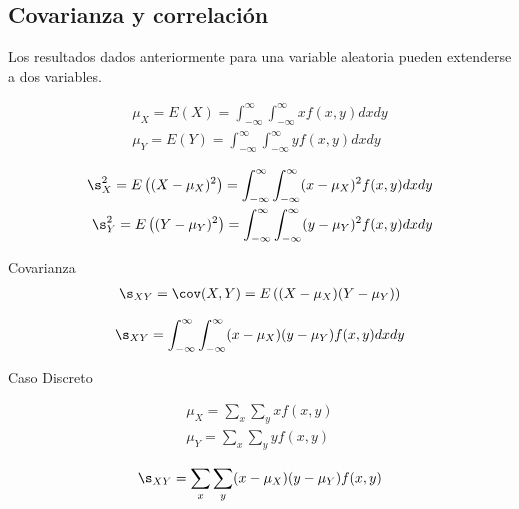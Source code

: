 \subsection{Covarianza y correlación}

Los resultados dados anteriormente para una variable aleatoria pueden extenderse a dos variables.


{}

\begin{equation}
 \label{eq:0.3.43}
 \begin{split}
  \mu_{X}=E(X)=\int_{-\infty}^{\infty}\int_{-\infty}^{\infty} xf(x,y)dxdy\\ 
  \mu_{Y}=E(Y)=\int_{-\infty}^{\infty}\int_{-\infty}^{\infty}
  yf(x,y)dxdy
 \end{split}
\end{equation}





\begin{equation}
 \label{eq:0.3.44}
 \begin{split}
  \s^{2}_{X}=E\left( (X-\mu_{X})^{2} \right)=\int_{-\infty}^{\infty}\int_{-\infty}^{\infty} (x-\mu_{X})^2f(x,y)dxdy\\ 
  \s^{2}_{Y}=E\left( (Y-\mu_{Y})^{2} \right)=\int_{-\infty}^{\infty}\int_{-\infty}^{\infty} (y-\mu_{Y})^2f(x,y)dxdy
 \end{split}
\end{equation}


{Covarianza}
 \begin{align}
 \label{eq:0.3.45}
  \s_{XY}=\cov(X,Y)=E\left( (X-\mu_{X})(Y-\mu_{Y}) \right)
 \end{align}



 \begin{align}
  \label{eq:0.3.46}
  \s_{XY}=\int_{-\infty}^{\infty}
  \int_{-\infty}^{\infty}
  (x-\mu_{X})(y-\mu_{Y})f(x,y)dxdy
 \end{align}


{Caso Discreto}

 \begin{equation}
  \begin{split}
   \mu_{X}=\sum_{x}\sum_{y}xf(x,y) \\
  \mu_{Y}=\sum_{x}\sum_{y}yf(x,y)
  \end{split}
 \end{equation}



 \begin{align}
  \label{eq:0.3.48}
  \s_{XY}=\sum_{x}\sum_{y}(x-\mu_{X})(y-\mu_{Y})f(x,y)
 \end{align}




